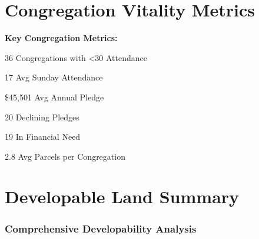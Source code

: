 \documentclass[
  letterpaper,
  DIV=11,
  numbers=noendperiod,
  oneside]{scrreprt}
\begin{document}
\chapter{Congregation Vitality
Metrics}\label{congregation-vitality-metrics}

\textbf{Key Congregation Metrics:}

{36} Congregations with \textless30 Attendance

{17} Avg Sunday Attendance

{\$45,501} Avg Annual Pledge

{20} Declining Pledges

{19} In Financial Need

{2.8} Avg Parcels per Congregation

\chapter{Developable Land Summary}\label{developable-land-summary}

\subsection{Comprehensive Developability
Analysis}\label{comprehensive-developability-analysis}
\end{document}
